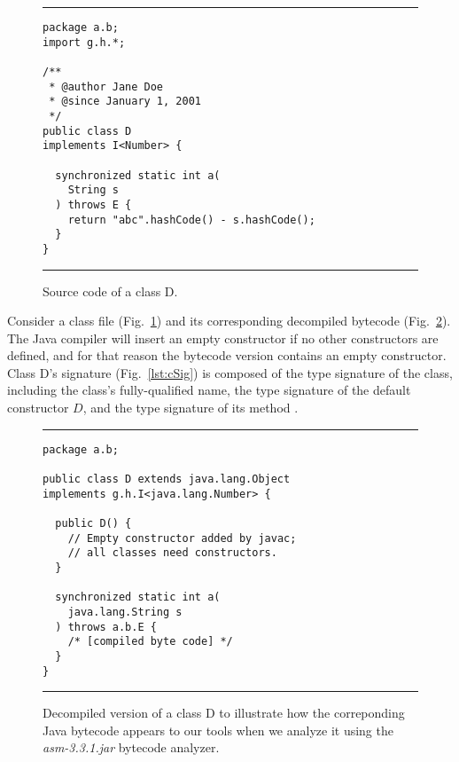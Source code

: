 \begin{figure}
  \centering
  \begin{minipage}[h]{0.85\linewidth}
\hrule
{}
\begin{lstlisting}
package a.b;
import g.h.*;

/**
 * @author Jane Doe
 * @since January 1, 2001
 */
public class D
implements I<Number> {

  synchronized static int a(
    String s
  ) throws E {
    return "abc".hashCode() - s.hashCode();
  }
}
\end{lstlisting}
\hrule\vspace{1mm}
  \end{minipage}
  \caption{\small{Source code of a class D.}}
\label{lst:cJava}
\end{figure}


Consider a class file  (Fig.~\ref{lst:cJava}) and its
corresponding decompiled bytecode (Fig.~\ref{lst:cClass}).  The Java
compiler will insert an empty constructor if no other constructors are
defined, and for that reason the bytecode version contains an empty
constructor.  Class D's signature (Fig.~\ref{lst:cSig}) is composed of the
type signature of the class, including the class's fully-qualified name,
the type signature of the default constructor
$D$, and the type signature of its method .


\begin{figure}
  \centering
  \begin{minipage}[h]{0.85\linewidth}
\hrule
{}
\begin{lstlisting}
package a.b;

public class D extends java.lang.Object
implements g.h.I<java.lang.Number> {

  public D() {
    // Empty constructor added by javac;
    // all classes need constructors.
  }

  synchronized static int a(
    java.lang.String s
  ) throws a.b.E {
    /* [compiled byte code] */
  }
}
\end{lstlisting}
\hrule\vspace{1mm}
\end{minipage}
  \caption{\small{Decompiled version of a class D to illustrate how the correponding Java bytecode
appears to our tools when we analyze it using the \emph{asm-3.3.1.jar} bytecode analyzer.}}
\label{lst:cClass}
\end{figure}


